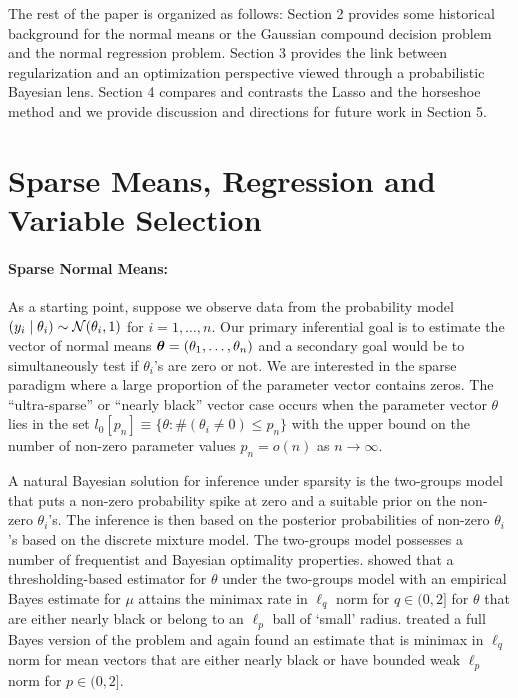 \documentclass[11pt]{article}
\begin{document}

The rest of the paper is organized as follows: Section 2 provides some historical background for the normal means or the Gaussian compound decision problem and the normal regression problem. Section 3 provides the link between regularization and an optimization perspective viewed through a probabilistic Bayesian lens. Section 4 compares and contrasts the Lasso and the horseshoe method and we provide discussion and directions for future work in Section 5. 

\section{Sparse Means, Regression and Variable Selection}

\paragraph{Sparse Normal Means:} As a starting point, suppose we observe data
from the probability model $  (y_i \mid \theta_i)  \sim {\cal N} (\theta_i,1)$ for
$i = 1, \ldots, n$. Our primary inferential goal is to estimate the vector of
normal means $ \boldsymbol{\theta} = ( \theta_1, \ldots , \theta_n )$ and a secondary goal
would be to simultaneously test if $\theta_i$'s are zero or not. We are
interested in the sparse paradigm where a large proportion of the parameter
vector contains zeros.  The ``ultra-sparse'' or ``nearly black'' vector case
occurs when the parameter vector $\theta$ lies in the set $ l_0 [ p_n] \equiv
\{ \theta : \# ( \theta_i \neq 0 ) \leq p_n \} $ with the upper bound on the
number of non-zero parameter values $ p_n = o(n) $ as $ n \to \infty$. 

A natural Bayesian solution for inference under sparsity is the two-groups
model that puts a non-zero probability spike at zero and a suitable prior on
the non-zero $\theta_i$'s. The inference is then based on the posterior
probabilities of non-zero $\theta_i$'s based on the discrete mixture model. The
two-groups model possesses a number of frequentist and Bayesian optimality
properties. \cite{johnstone2004needles} showed that a thresholding-based
estimator for $\theta$ under the two-groups model with an empirical Bayes
estimate for $\mu$ attains the minimax rate in $\ell_q$ norm for $q \in (0,2]$
for $\theta$ that are either nearly black or belong to an $\ell_p$ ball of
`small' radius. \cite{castillo2012needles} treated a full Bayes version of the
problem and again found an estimate that is minimax in $\ell_q$ norm for mean
vectors that are either nearly black or have bounded weak $\ell_p$ norm for $p
\in (0,2]$. 
\end{document}
